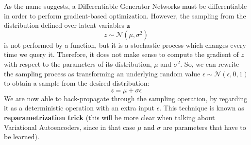 As the name suggests, a Differentiable Generator Networks must be differentiable in order to perform gradient-based optimization. However, the sampling from the distribution defined over latent variables $\textbf{z}$
\[z \sim \mathcal{N}(\mu, \sigma^2)\]
is not performed by a function, but it is a stochastic process which changes every time we query it. Therefore, it does not make sense to compute the gradient of $z$ with respect to the parameters of its distribution, $\mu$ and $\sigma^2$. So, we can rewrite the sampling process as transforming an underlying random value $\epsilon \sim \mathcal{N}(\epsilon, 0, 1)$ to obtain a sample from the desired distribution:
\[z = \mu + \sigma \epsilon\]
We are now able to back-propagate through the sampling operation, by regarding it as a deterministic operation with an extra input $\epsilon$. This technique is known as \textbf{reparametrization trick} (this will be more clear when talking about Variational Autoencoders, since in that case $\mu$ and $\sigma$ are parameters that have to be learned).

